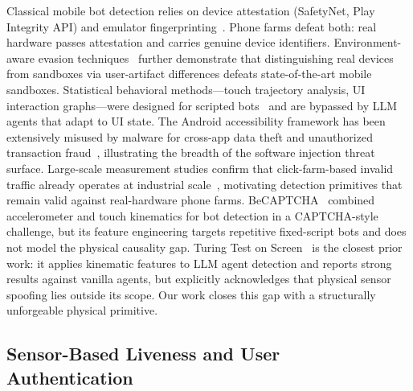 Classical mobile bot detection relies on device attestation (SafetyNet, Play Integrity API)
and emulator fingerprinting~\cite{emulatordetect2022}.%
Phone farms defeat both: real hardware passes attestation and carries genuine device
identifiers.%
Environment-aware evasion techniques~\cite{sandboxevasion2022} further demonstrate that
distinguishing real devices from sandboxes via user-artifact differences defeats
state-of-the-art mobile sandboxes.%
Statistical behavioral methods---touch trajectory analysis, UI interaction graphs---were
designed for scripted bots~\cite{frauddroid2017} and are bypassed by LLM agents that
adapt to UI state.%
The Android accessibility framework has been extensively misused by malware for
cross-app data theft and unauthorized transaction fraud~\cite{a11yabuse2021,dva2024},
illustrating the breadth of the software injection threat surface.%
Large-scale measurement studies confirm that click-farm-based invalid traffic already
operates at industrial scale~\cite{clickfraud2021,adffraud2021}, motivating detection
primitives that remain valid against real-hardware phone farms.%
BeCAPTCHA~\cite{becaptcha2021} combined accelerometer and touch kinematics for bot
detection in a CAPTCHA-style challenge, but its feature engineering targets
repetitive fixed-script bots and does not model the physical causality gap.%
Turing Test on Screen~\cite{ttos2026} is the closest prior work: it applies kinematic
features to LLM agent detection and reports strong results against vanilla agents, but
explicitly acknowledges that physical sensor spoofing lies outside its scope.%
Our work closes this gap with a structurally unforgeable physical primitive.%

\subsection{Sensor-Based Liveness and User Authentication}
\label{sec:rw_liveness}

